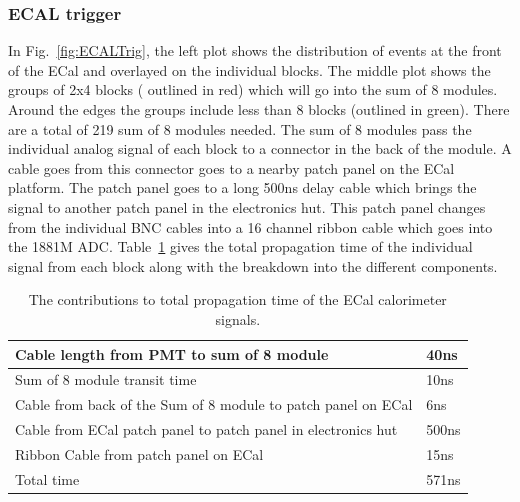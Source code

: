 \documentclass{article}
\begin{document}
\subsubsection{ECAL trigger}
 \label{sec:ecal-trig}
 In Fig.~\ref{fig:ECALTrig}, the left plot shows the distribution of events at the front of the ECal
 and overlayed on the individual blocks. The middle plot shows the groups of 2x4 blocks ( outlined in red)
 which will go into the sum of 8 modules. Around the edges the groups include less than 8 blocks 
 (outlined in green). There are a total of 219 sum of 8 modules needed.
 The sum of 8 modules pass the individual analog signal of each block to a connector in the
 back of the module. A cable goes from this connector goes to a nearby patch panel on the ECal platform. The patch panel goes to a long 500ns delay cable which brings the signal to
 another patch panel in the electronics hut. This patch panel changes from the individual BNC cables into a 16 channel ribbon cable which goes into the 1881M ADC. 
 Table~\ref{tab:ECALadctime} gives the total propagation time of the individual signal from each block along with the breakdown into the different components.
 \begin{table}[b]
 	\begin{tabular}{|l|l|} \hline
 		Cable length from PMT to sum of 8 module & 40ns \\ \hline
 		Sum of 8 module transit time & 10ns \\ \hline
 		Cable from back of the Sum of 8 module to patch panel on ECal & 6ns \\ \hline
 		Cable from ECal patch panel to patch panel in electronics hut & 500ns \\ \hline
 		Ribbon Cable from patch panel on ECal & 15ns \\ \hline
 		  		Total time & 571ns \\ \hline  		   		  		 		 
 	\end{tabular}
 	\caption{The contributions to total propagation time  of the ECal calorimeter signals.}
 	\label{tab:ECALadctime}
 \end{table}
 
 
 
\end{document}
